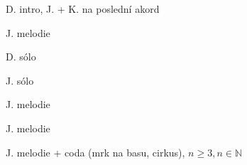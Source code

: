 \documentclass[timestamp]{jazzgrid}
\begin{document}
\footnotesize
\begin{description}[noitemsep,align=right,labelwidth=\widthof{\bfseries{$2\times$AABA}}]
	\item [A] D. intro, J. + K. na poslední akord
	\item [AABA] J. melodie
	\item [$2\times$AABA] D. sólo
	\item [$2\times$AABA] J. sólo
	\item [AAB\phantom{A}] J. melodie
	\item [AABB\textsubscript{2}] J. melodie
	\item [{\phantom{AAB}$[$A\textsubscript{2}$]_n$}] J. melodie + coda (mrk na basu, cirkus), $n \geq 3, n \in \mathbb{N}$
\end{description}
\end{document}
